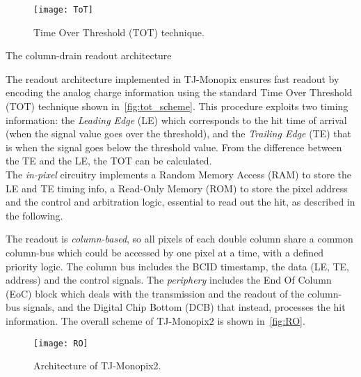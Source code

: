 \begin{figure}[h!]
\centering
\texttt{[image: ToT]}
\caption{Time Over Threshold (TOT) technique.}
\label{fig:tot_scheme}
\end{figure}

\begin{description}
\item[The column-drain readout architecture]
\end{description}

The readout architecture \cite{Moustakas:2018ure, Moustakas:2021gjr} implemented in TJ-Monopix ensures fast readout by encoding the analog charge information using the standard Time Over Threshold (TOT) technique shown in~\autoref{fig:tot_scheme}. This procedure exploits two timing information: the \textit{Leading Edge} (LE) which corresponds to the hit time of arrival (when the signal value goes over the threshold), and the \textit{Trailing Edge} (TE) that is when the signal goes below the threshold value. From the difference between the TE and the LE, the TOT can be calculated.\\

The \textit{in-pixel} circuitry implements a Random Memory Access (RAM) to store the LE and TE timing info, a Read-Only Memory (ROM) to store the pixel address and the control and arbitration logic, essential to read out the hit, as described in the following.
 
The readout is \textit{column-based}, so all pixels of each double column share a common column-bus which could be accessed by one pixel at a time, with a defined priority logic. The column bus includes the BCID timestamp, the data (LE, TE, address) and the control signals.
The \textit{periphery} includes the End Of Column (EoC) block which deals with the transmission and the readout of the column-bus signals, and the Digital Chip Bottom (DCB) that instead, processes the hit information. The overall scheme of TJ-Monopix2 is shown in~\autoref{fig:RO}. 

\begin{figure}[h!]
\centering
\texttt{[image: RO]}
\caption{Architecture of TJ-Monopix2.}
\label{fig:RO}
\end{figure}

\begin{comment}
The readout could be triggered or full-readout. In TJ-Monopix line hit data is continuously transmitted to the DAQ. In case of triggered readout instead, hit data is stored in a trigger memory, and the information is transmitted only when the trigger signal arrives.
\end{comment}

